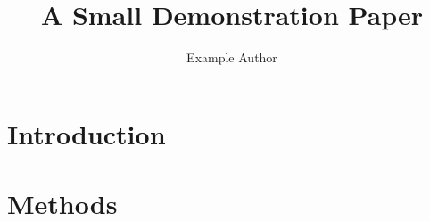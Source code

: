 \documentclass{article}
\title{A Small Demonstration Paper}
\author{Example Author}
\begin{document}
\maketitle

\section{Introduction}


\section{Methods}

\end{document}
